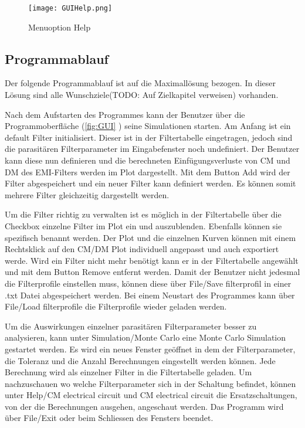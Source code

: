 \begin{figure}[H]
	\centering
	\texttt{[image: GUIHelp.png]}
	\caption{Menuoption Help}
	\label{fig:GUIHelp}
\end{figure}

\subsection{Programmablauf} \label{subsec:programmablauf}

Der folgende Programmablauf ist auf die Maximallösung bezogen. In dieser Lösung sind alle Wunschziele(TODO: Auf Zielkapitel verweisen) vorhanden.

Nach dem Aufstarten des Programmes kann der Benutzer über die Programmoberfläche (\ref{fig:GUI} ) seine Simulationen starten.
Am Anfang ist ein default Filter initialisiert. Dieser ist in der Filtertabelle eingetragen, jedoch sind die parasitären Filterparameter im Eingabefenster noch undefiniert. Der Benutzer kann diese nun definieren und die berechneten Einfügungsverluste von CM und DM des EMI-Filters werden im Plot dargestellt. Mit dem Button Add wird der Filter abgespeichert und ein neuer Filter kann definiert werden. Es können somit mehrere Filter gleichzeitig dargestellt werden. 

Um die Filter richtig zu verwalten ist es möglich in der Filtertabelle über die Checkbox einzelne Filter im Plot ein und auszublenden. Ebenfalls können sie spezifisch benannt werden. Der Plot und die einzelnen Kurven können mit einem Rechtsklick auf den CM/DM Plot individuell angepasst und auch exportiert werde. Wird ein Filter nicht mehr benötigt kann er in der Filtertabelle angewählt und mit dem Button Remove entfernt werden. Damit der Benutzer nicht jedesmal die Filterprofile einstellen muss, können diese über File/Save filterprofil in einer .txt Datei abgespeichert werden. Bei einem Neustart des Programmes kann über File/Load filterprofile die Filterprofile wieder geladen werden. 

Um die Auswirkungen einzelner parasitären Filterparameter besser zu analysieren, kann unter Simulation/Monte Carlo eine Monte Carlo Simulation gestartet werden. Es wird ein neues Fenster geöffnet in dem der Filterparameter, die Toleranz und die Anzahl Berechnungen eingestellt werden können. Jede Berechnung wird als einzelner Filter in die Filtertabelle geladen. Um nachzuschauen wo welche Filterparameter sich in der Schaltung befindet, können unter Help/CM electrical circuit und CM electrical circuit die Ersatzschaltungen, von der die Berechnungen ausgehen, angeschaut werden. Das Programm wird über File/Exit oder beim Schliessen des Fensters beendet.

